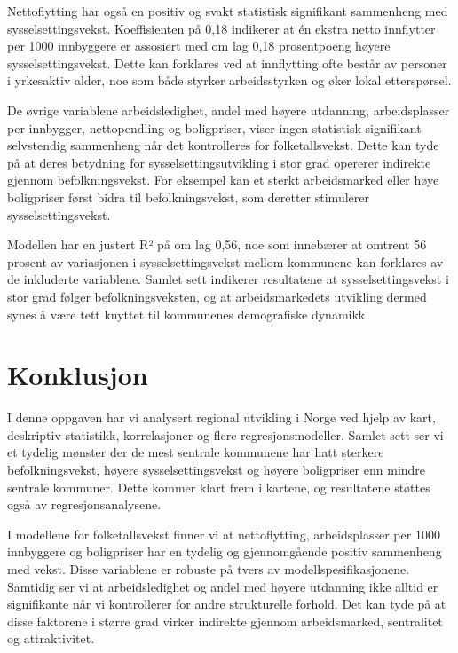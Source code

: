 \documentclass[
  norsk,
  letterpaper,
  DIV=11,
  numbers=noendperiod]{scrartcl}
\begin{document}
Nettoflytting har også en positiv og svakt statistisk signifikant
sammenheng med sysselsettingsvekst. Koeffisienten på 0,18 indikerer at
én ekstra netto innflytter per 1000 innbyggere er assosiert med om lag
0,18 prosentpoeng høyere sysselsettingsvekst. Dette kan forklares ved at
innflytting ofte består av personer i yrkesaktiv alder, noe som både
styrker arbeidsstyrken og øker lokal etterspørsel.

De øvrige variablene arbeidsledighet, andel med høyere utdanning,
arbeidsplasser per innbygger, nettopendling og boligpriser, viser ingen
statistisk signifikant selvstendig sammenheng når det kontrolleres for
folketallsvekst. Dette kan tyde på at deres betydning for
sysselsettingsutvikling i stor grad opererer indirekte gjennom
befolkningsvekst. For eksempel kan et sterkt arbeidsmarked eller høye
boligpriser først bidra til befolkningsvekst, som deretter stimulerer
sysselsettingsvekst.

Modellen har en justert R² på om lag 0,56, noe som innebærer at omtrent
56 prosent av variasjonen i sysselsettingsvekst mellom kommunene kan
forklares av de inkluderte variablene. Samlet sett indikerer resultatene
at sysselsettingsvekst i stor grad følger befolkningsveksten, og at
arbeidsmarkedets utvikling dermed synes å være tett knyttet til
kommunenes demografiske dynamikk.

\section{Konklusjon}\label{konklusjon}

I denne oppgaven har vi analysert regional utvikling i Norge ved hjelp
av kart, deskriptiv statistikk, korrelasjoner og flere
regresjonsmodeller. Samlet sett ser vi et tydelig mønster der de mest
sentrale kommunene har hatt sterkere befolkningsvekst, høyere
sysselsettingsvekst og høyere boligpriser enn mindre sentrale kommuner.
Dette kommer klart frem i kartene, og resultatene støttes også av
regresjonsanalysene.

I modellene for folketallsvekst finner vi at nettoflytting,
arbeidsplasser per 1000 innbyggere og boligpriser har en tydelig og
gjennomgående positiv sammenheng med vekst. Disse variablene er robuste
på tvers av modellspesifikasjonene. Samtidig ser vi at arbeidsledighet
og andel med høyere utdanning ikke alltid er signifikante når vi
kontrollerer for andre strukturelle forhold. Det kan tyde på at disse
faktorene i større grad virker indirekte gjennom arbeidsmarked,
sentralitet og attraktivitet.
\end{document}
